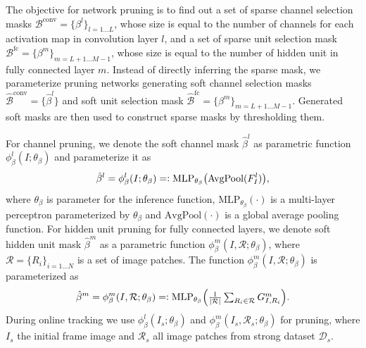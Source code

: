 \documentclass[letterpaper]{article} %
\newcommand{\eqdef}{=\vcentcolon}
\begin{document}
The objective for network pruning is to find out a set of sparse channel selection masks $\mathcal{B}^\text{conv}=\{\beta^l\}_{l=1...L}$, whose size is equal to the number of channels for each activation map in convolution layer $l$, and a set of sparse unit selection mask $\mathcal{B}^\text{fc}=\{\beta^m\}_{m=L+1...M-1}$, whose size is equal to the number of hidden unit in fully connected layer $m$.
Instead of directly inferring the sparse mask, we parameterize pruning networks generating soft channel selection masks $\hat{\mathcal{B}}^\text{conv}=\{\hat{\beta}^l\}$ and soft unit selection mask $\hat{\mathcal{B}}^\text{fc}=\{\beta^m\}_{m=L+1...M-1}$.
Generated soft masks are then used to construct sparse masks by thresholding them.

For channel pruning, we denote the soft channel mask $\hat{\beta}^l$ as parametric function $\phi^l_\beta(I;\theta_\beta)$ and parameterize it as
\begin{equation}
    \hat{\beta}^l=\phi^l_\beta(I;\theta_\beta) \eqdef \text{MLP}_{\theta_\beta}\big(\text{AvgPool}(F^l_I)\big),
\end{equation}
where $\theta_\beta$ is parameter for the inference function, $\text{MLP}_{\theta_\beta}(\cdot)$ is a multi-layer perceptron parameterized by $\theta_\beta$ and $\text{AvgPool}(\cdot)$ is a global average pooling function.
For hidden unit pruning for fully connected layers, we denote soft hidden unit mask $\hat{\beta}^m$ as a parametric function $\phi^m_\beta(I, \mathcal{R};\theta_\beta)$, where $\mathcal{R}=\{R_i\}_{i=1...N}$ is a set of image patches.
The function $\phi^m_\beta(I, \mathcal{R};\theta_\beta)$ is parameterized as
\begin{equation}
    \hat{\beta}^m
    =\phi^m_\beta(I,\mathcal{R};\theta_\beta)
    \eqdef \textstyle\text{MLP}_{\theta_\beta}\Big(\frac{1}{|\mathcal{R}|}\sum_{R_i\in \mathcal{R}}G^m_{I,R_i}\Big).
\end{equation}
During online tracking we use $\phi^l_\beta(I_s;\theta_\beta)$ and $\phi^m_\beta(I_s, \mathcal{R}_s; \theta_\beta)$ for pruning, where $I_s$ the initial frame image and $\mathcal{R}_s$ all image patches from strong dataset $\mathcal{D}_s$.
\end{document}
